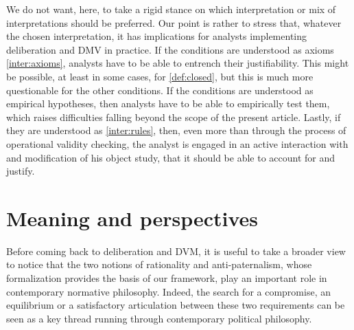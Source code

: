 \documentclass[version=3.21, pagesize, twoside=off, bibliography=totoc, DIV=calc, fontsize=12pt, a4paper, french, english]{scrartcl}
\begin{document}
We do not want, here, to take a rigid stance on which interpretation or mix of interpretations should be preferred. Our point is rather to stress that, whatever the chosen interpretation, it has implications for analysts implementing deliberation and DMV in practice. If the conditions are understood as axioms \ref{inter:axioms}, analysts have to be able to entrench their justifiability. This might be possible, at least in some cases, for \cref{def:closed}, but this is much more questionable for the other conditions. If the conditions are understood as empirical hypotheses, then analysts have to be able to empirically test them, which raises difficulties falling beyond the scope of the present article.  Lastly, if they are understood as \ref{inter:rules}, then, even more than through the process of operational validity checking, the analyst is engaged in an active interaction with and modification of his object study, that it should be able to account for and justify.

\section{Meaning and perspectives}
\label{disc}
Before coming back to deliberation and DVM, it is useful to take a broader view to notice that the two notions of rationality and anti-paternalism, whose formalization provides the basis of our framework, play an important role in contemporary normative philosophy. Indeed, the search for a compromise, an equilibrium or a satisfactory articulation between these two requirements can be seen as a key thread running through contemporary political philosophy.
\end{document}
